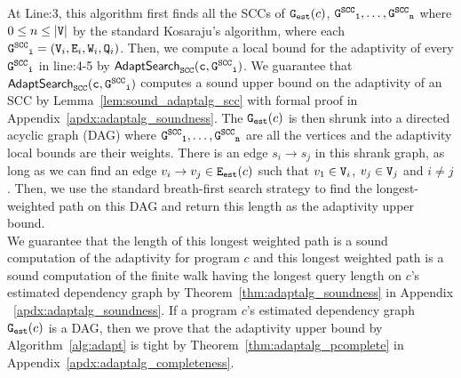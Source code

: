  At Line:3, this algorithm first finds all the SCCs of $\mathtt{{G_{est}}}(c)$, $\mathtt{\mathtt{G^{SCC}}_1}, \ldots, \mathtt{\mathtt{G^{SCC}}_n}$
 where $0 \leq n \leq |\mathtt{V}|$ by the standard Kosaraju’s algorithm, where each
 $\mathtt{\mathtt{G^{SCC}}_i} = (\mathtt{V}_i, \mathtt{E}_i, \mathtt{W}_i, \mathtt{Q}_i)$.
 Then, 
 we compute a local bound for the adaptivity of every $\mathtt{\mathtt{G^{SCC}}_i}$
 in line:4-5 by $\mathtt{\mathsf{AdaptSearch}_{SCC}(c, \mathtt{G^{SCC}}_i)}$.
 We guarantee that $\mathtt{\mathsf{AdaptSearch}_{SCC}(c, \mathtt{G^{SCC}}_i)}$ computes a sound upper bound on the adaptivity of an SCC by Lemma~\ref{lem:sound_adaptalg_scc} with formal proof in Appendix~\ref{apdx:adaptalg_soundness}.
 The $\mathtt{{G_{est}}}(c)$ is then shrunk into a directed acyclic graph (DAG) where 
 $\mathtt{\mathtt{G^{SCC}}_1}, \ldots, \mathtt{\mathtt{G^{SCC}}_n}$ are all the vertices and the adaptivity local bounds are their weights.
 There is an edge $s_i \to s_j$ in this shrank graph, as long as we can find an edge $v_i \to v_j \in \mathtt{{E_{est}}}(c)$ such that $v_1 \in \mathtt{V}_i$, $v_j \in \mathtt{V}_j$ and $i \neq j$.
 Then, we use the standard breath-first search strategy to find the longest-weighted path
 on this DAG and return this length as the adaptivity upper bound.
 \\
 We guarantee that 
 the length of this longest weighted path is a sound computation of the adaptivity for program $c$
 and this longest weighted path is a sound computation of the finite walk having the longest query length 
 on $c$'s estimated dependency graph by Theorem~\ref{thm:adaptalg_soundness}
 in Appendix
 ~\ref{apdx:adaptalg_soundness}.
If a program
$c$'s estimated dependency graph $\mathtt{{G_{est}}}(c)$ is a DAG, then we prove that the adaptivity upper bound by Algorithm~\ref{alg:adapt} is tight by Theorem~\ref{thm:adaptalg_pcomplete} in Appendix~\ref{apdx:adaptalg_completeness}.

